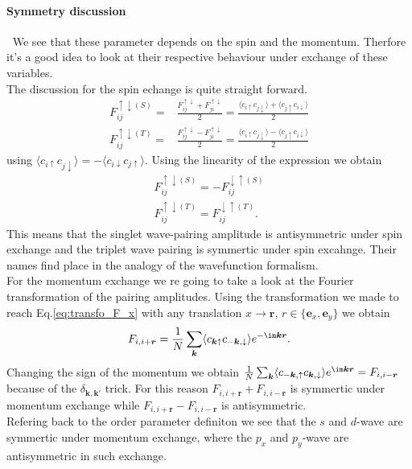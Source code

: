 \documentclass[../main.tex]{subfile}
\begin{document}
\paragraph{Symmetry discussion} $~$ We see that these parameter depends on the spin and the momentum. Therfore it's a good idea to look at their respective
behaviour under exchange of these variables.\\

The discussion for the spin echange is quite straight forward.
\begin{align*}
    F_{ij}^{\uparrow\downarrow(S)} =& \frac{F_{ij}^{\uparrow\downarrow} + F_{ji}^{\uparrow\downarrow}}{2} = \frac{\langle c_{i\uparrow}c_{j\downarrow}\rangle + \langle c_{j\uparrow}c_{i\downarrow}\rangle}{2}\\
    F_{ij}^{\uparrow\downarrow(T)} =& \frac{F_{ij}^{\uparrow\downarrow} - F_{ji}^{\uparrow\downarrow}}{2} = \frac{\langle c_{i\uparrow}c_{j\downarrow}\rangle - \langle c_{j\uparrow}c_{i\downarrow}\rangle}{2}
\end{align*}
 using $\langle c_{i\uparrow}c_{j\downarrow}\rangle = -\langle c_{i\downarrow}c_{j\uparrow}\rangle$. Using the linearity of the expression we obtain
\begin{align*}
    F_{ij}^{\uparrow\downarrow(S)} = - F_{ij}^{\downarrow\uparrow(S)}\\
    F_{ij}^{\uparrow\downarrow(T)} = F_{ij}^{\downarrow\uparrow(T)}.
\end{align*}
This means that the singlet wave-pairing amplitude is antisymmetric under spin exchange and the triplet wave pairing is symmertic under spin excahnge. Their names
find place in the analogy of the wavefunction formalism.\\

For the momentum exchange we re going to take a look at the Fourier transformation of the pairing amplitudes. Using the transformation we made to 
reach Eq.\ref{eq:transfo_F_x} with any translation $ x \rightarrow \bm{r}$, $r\in \{\bm{e}_x,\bm{e}_y\}$ we obtain
\begin{align*}
    F_{i,i+ \bm{r}} = \frac{1}{N} \sum_{\bm{k}} \langle c_{\bm{k}\uparrow} c_{-\bm{k},\downarrow}\rangle e^{-\im\bm{k}\bm{r}}.
\end{align*}
Changing the sign of the momentum we obtain  $\frac{1}{N} \sum_{\bm{k}} \langle c_{-\bm{k},\uparrow} c_{\bm{k},\downarrow}\rangle e^{\im\bm{k}\bm{r}} =  F_{i,i- \bm{r}}$
because of the $\delta_{\bm{k},\bm{k}'}$ trick. For this reason $F_{i,i+ \bm{r}} +  F_{i,i- \bm{r}}$ is symmertic under momentum exchange while $F_{i,i+ \bm{r}} -  F_{i,i- \bm{r}}$ is antisymmetric.\\
Refering back to the order parameter definiton we see that the $s$ and $d$-wave are symmertic under momentum exchange, where the $p_x$ and $p_y$-wave are antisymmetric in such exchange.\\
\end{document}
